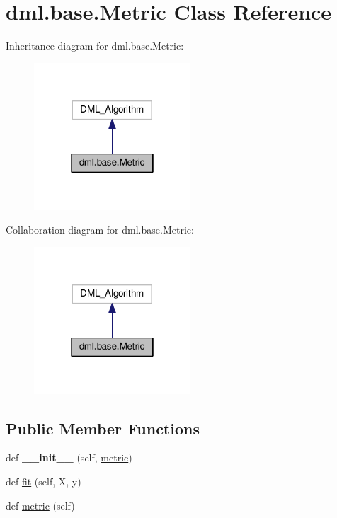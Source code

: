 \hypertarget{classdml_1_1base_1_1Metric}{}\section{dml.\+base.\+Metric Class Reference}
\label{classdml_1_1base_1_1Metric}


Inheritance diagram for dml.\+base.\+Metric\+:\nopagebreak
\begin{figure}[H]
\begin{center}
\leavevmode
\includegraphics[width=166pt]{classdml_1_1base_1_1Metric__inherit__graph}
\end{center}
\end{figure}


Collaboration diagram for dml.\+base.\+Metric\+:\nopagebreak
\begin{figure}[H]
\begin{center}
\leavevmode
\includegraphics[width=166pt]{classdml_1_1base_1_1Metric__coll__graph}
\end{center}
\end{figure}
\subsection*{Public Member Functions}
\begin{DoxyCompactItemize}
\item 
def {\bfseries \+\_\+\+\_\+init\+\_\+\+\_\+} (self, \hyperlink{classdml_1_1base_1_1Metric_a41a9f7544ff22d3b05e3b5451e4c16b0}{metric})\hypertarget{classdml_1_1base_1_1Metric_aca79aaafeef1b4b94081a24579f2f254}{}\label{classdml_1_1base_1_1Metric_aca79aaafeef1b4b94081a24579f2f254}

\item 
def \hyperlink{classdml_1_1base_1_1Metric_ad94ffd257c24ae5e291d301131bbd874}{fit} (self, X, y)
\item 
def \hyperlink{classdml_1_1base_1_1Metric_a41a9f7544ff22d3b05e3b5451e4c16b0}{metric} (self)
\end{DoxyCompactItemize}
